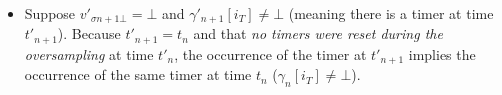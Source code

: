 \begin{skippableproof}
\begin{itemize}
\begin{align*}
              \end{align*}
              which implies:
              \begin{align*}
                  s'_{n+2}                                                                       & = s_{n+1}                                            \\
                  \CurrVal{ty_\sigma}{[v_{0\bot}, \dots, v_{n-1\bot}, v'_{n\bot}, v'_{n+1\bot}]} & = \CurrVal{ty_\sigma}{[v_{0\bot}, \dots, v_{n\bot}]} \\
                  [(i'_{Tn+1}, t'_{Tn+1})^+]                                                     & = [(i_{Tn}, t_{Tn})^+].
              \end{align*}

        \item Suppose $v'_{\sigma n+1\bot} = \bot$ and $\gamma'_{n+1}[i_T] \neq \bot$ (meaning there
              is a timer at time $t'_{n+1}$). Because $t'_{n+1} = t_n$ and that \emph{no timers were
                  reset during the oversampling} at time $t'_n$, the occurrence of the timer at
              $t'_{n+1}$ implies the occurrence of the same timer at time $t_n$
              ($\gamma_n[i_T] \neq \bot$).


\end{itemize}
\end{skippableproof}
